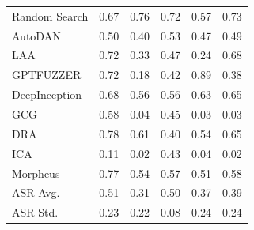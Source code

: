 \documentclass[11pt]{article}
\begin{document}
\begin{table}[htbp]
{\begin{tabular}[c]{l|ccccc}
Random Search & {\cellcolor[RGB]{234,190,202} 0.67} & {\cellcolor[RGB]{242,187,198} 0.76} & {\cellcolor[RGB]{239,188,200} 0.72} & {\cellcolor[RGB]{225,194,206} 0.57} & {\cellcolor[RGB]{240,188,199} 0.73} \\
AutoDAN & {\cellcolor[RGB]{218,197,209} 0.50} & {\cellcolor[RGB]{209,200,213} 0.40} & {\cellcolor[RGB]{221,195,208} 0.53} & {\cellcolor[RGB]{215,198,210} 0.47} & {\cellcolor[RGB]{217,197,209} 0.49} \\
LAA & {\cellcolor[RGB]{239,188,200} 0.72} & {\cellcolor[RGB]{202,203,216} 0.33} & {\cellcolor[RGB]{215,198,210} 0.47} & {\cellcolor[RGB]{194,207,220} 0.24} & {\cellcolor[RGB]{235,190,201} 0.68} \\
GPTFUZZER & {\cellcolor[RGB]{239,188,200} 0.72} & {\cellcolor[RGB]{188,209,222} 0.18} & {\cellcolor[RGB]{211,200,212} 0.42} & {\cellcolor[RGB]{255,182,193} 0.89} & {\cellcolor[RGB]{207,201,214} 0.38} \\
DeepInception & {\cellcolor[RGB]{235,190,201} 0.68} & {\cellcolor[RGB]{224,194,206} 0.56} & {\cellcolor[RGB]{224,194,206} 0.56} & {\cellcolor[RGB]{230,192,203} 0.63} & {\cellcolor[RGB]{232,191,203} 0.65} \\
GCG & {\cellcolor[RGB]{226,193,206} 0.58} & {\cellcolor[RGB]{175,214,228} 0.04} & {\cellcolor[RGB]{214,199,211} 0.45} & {\cellcolor[RGB]{174,215,229} 0.03} & {\cellcolor[RGB]{174,215,229} 0.03} \\
DRA & {\cellcolor[RGB]{244,186,197} 0.78} & {\cellcolor[RGB]{228,192,204} 0.61} & {\cellcolor[RGB]{209,200,213} 0.40} & {\cellcolor[RGB]{222,195,207} 0.54} & {\cellcolor[RGB]{232,191,203} 0.65} \\
ICA & {\cellcolor[RGB]{182,212,225} 0.11} & {\cellcolor[RGB]{173,215,229} 0.02} & {\cellcolor[RGB]{212,199,212} 0.43} & {\cellcolor[RGB]{175,214,228} 0.04} & {\cellcolor[RGB]{173,215,229} 0.02} \\
Morpheus & {\cellcolor[RGB]{243,186,198} 0.77} & {\cellcolor[RGB]{222,195,207} 0.54} & {\cellcolor[RGB]{225,194,206} 0.57} & {\cellcolor[RGB]{219,196,208} 0.51} & {\cellcolor[RGB]{226,193,206} 0.58} \\
\midrule
\midrule
ASR Avg. & {\cellcolor[RGB]{219,196,208} 0.51} & {\cellcolor[RGB]{200,204,217} 0.31} & {\cellcolor[RGB]{218,197,209} 0.50} & {\cellcolor[RGB]{206,202,214} 0.37} & {\cellcolor[RGB]{208,201,214} 0.39} \\
ASR Std. & {\cellcolor[RGB]{193,207,220} 0.23} & {\cellcolor[RGB]{192,207,221} 0.22} & {\cellcolor[RGB]{179,213,227} 0.08} & {\cellcolor[RGB]{194,207,220} 0.24} & {\cellcolor[RGB]{194,207,220} 0.24} \\
\bottomrule
\end{tabular}
}
\end{table}
\end{document}

